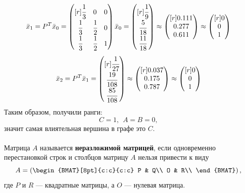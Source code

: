 \documentclass[12pt]{article}
\theoremstyle{definition}
\numberwithin{equation}{section}
\begin{document}
	\[\bar x_1 = P^T\bar x_0=\begin{pmatrix}[r]
	\cfrac{1}{3} & 0 & 0\\
	\cfrac{1}{3} & \cfrac{1}{2} & 0\\
	\cfrac{1}{3} & \cfrac{1}{2} & 1\\
	\end{pmatrix}\bar x_0 = \begin{pmatrix}[r]
	\cfrac{1}{9}\\
	\cfrac{5}{18}\\
	\cfrac{11}{18}\\
	\end{pmatrix} \approx \begin{pmatrix}[r]
	0.111\\
	0.277\\
	0.611\\
	\end{pmatrix}\approx \begin{pmatrix}[r]
	0\\
	0\\
	1\\
	\end{pmatrix}\]
	\[\bar x_2 = P^T\bar x_1= \begin{pmatrix}[r]
	\cfrac{1}{27}\\
	\cfrac{19}{108}\\
	\cfrac{85}{108}\\
	\end{pmatrix} \approx \begin{pmatrix}[r]
	0.037\\
	0.175\\
	0.787\\
	\end{pmatrix}\approx \begin{pmatrix}[r]
	0\\
	0\\
	1\\
	\end{pmatrix}\]
	Таким образом, получили ранги:
	$$C=1,~~A=B=0,$$
	значит самая влиятельная вершина в графе это $C$.\\
	\\
	Матрица $A$ называется \textbf{неразложимой матрицей}, если одновременно перестановкой строк и столбцов матрицу $A$ нельзя привести к виду
	\[ 
	A=
	\left(
	\begin{BMAT}[8pt]{c:c}{c:c}
	P & Q\\
	O & R\\
	\end{BMAT} 
	\right),
	\]
	где $P$ и $R$ --- квадратные матрицы, а $O$ --- нулевая матрица.\\
\end{document}
